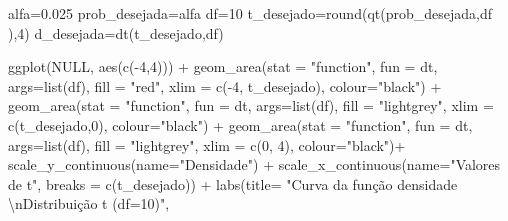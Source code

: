\documentclass[
]{book}
\newenvironment{Shaded}{\begin{snugshade}}{\end{snugshade}}
\newcommand{\AttributeTok}[1]{\textcolor[rgb]{0.77,0.63,0.00}{#1}}
\newcommand{\ConstantTok}[1]{\textcolor[rgb]{0.00,0.00,0.00}{#1}}
\newcommand{\DecValTok}[1]{\textcolor[rgb]{0.00,0.00,0.81}{#1}}
\newcommand{\FloatTok}[1]{\textcolor[rgb]{0.00,0.00,0.81}{#1}}
\newcommand{\FunctionTok}[1]{\textcolor[rgb]{0.00,0.00,0.00}{#1}}
\newcommand{\NormalTok}[1]{#1}
\newcommand{\OtherTok}[1]{\textcolor[rgb]{0.56,0.35,0.01}{#1}}
\newcommand{\SpecialCharTok}[1]{\textcolor[rgb]{0.00,0.00,0.00}{#1}}
\newcommand{\StringTok}[1]{\textcolor[rgb]{0.31,0.60,0.02}{#1}}
\begin{document}
\begin{Shaded}
\begin{Highlighting}[]
\NormalTok{alfa}\OtherTok{=}\FloatTok{0.025}
\NormalTok{prob\_desejada}\OtherTok{=}\NormalTok{alfa}
\NormalTok{df}\OtherTok{=}\DecValTok{10}
\NormalTok{t\_desejado}\OtherTok{=}\FunctionTok{round}\NormalTok{(}\FunctionTok{qt}\NormalTok{(prob\_desejada,df ),}\DecValTok{4}\NormalTok{)}
\NormalTok{d\_desejada}\OtherTok{=}\FunctionTok{dt}\NormalTok{(t\_desejado,df)}


\FunctionTok{ggplot}\NormalTok{(}\ConstantTok{NULL}\NormalTok{, }\FunctionTok{aes}\NormalTok{(}\FunctionTok{c}\NormalTok{(}\SpecialCharTok{{-}}\DecValTok{4}\NormalTok{,}\DecValTok{4}\NormalTok{))) }\SpecialCharTok{+}
  \FunctionTok{geom\_area}\NormalTok{(}\AttributeTok{stat =} \StringTok{"function"}\NormalTok{, }
            \AttributeTok{fun =}\NormalTok{ dt,}
            \AttributeTok{args=}\FunctionTok{list}\NormalTok{(df), }
            \AttributeTok{fill =} \StringTok{"red"}\NormalTok{, }
            \AttributeTok{xlim =} \FunctionTok{c}\NormalTok{(}\SpecialCharTok{{-}}\DecValTok{4}\NormalTok{, t\_desejado),}
            \AttributeTok{colour=}\StringTok{"black"}\NormalTok{) }\SpecialCharTok{+}
  \FunctionTok{geom\_area}\NormalTok{(}\AttributeTok{stat =} \StringTok{"function"}\NormalTok{, }
            \AttributeTok{fun =}\NormalTok{ dt, }
            \AttributeTok{args=}\FunctionTok{list}\NormalTok{(df), }
            \AttributeTok{fill =} \StringTok{"lightgrey"}\NormalTok{, }
            \AttributeTok{xlim =} \FunctionTok{c}\NormalTok{(t\_desejado,}\DecValTok{0}\NormalTok{),}
            \AttributeTok{colour=}\StringTok{"black"}\NormalTok{) }\SpecialCharTok{+}
  \FunctionTok{geom\_area}\NormalTok{(}\AttributeTok{stat =} \StringTok{"function"}\NormalTok{, }
            \AttributeTok{fun =}\NormalTok{ dt, }
            \AttributeTok{args=}\FunctionTok{list}\NormalTok{(df), }
            \AttributeTok{fill =} \StringTok{"lightgrey"}\NormalTok{, }
            \AttributeTok{xlim =} \FunctionTok{c}\NormalTok{(}\DecValTok{0}\NormalTok{, }\DecValTok{4}\NormalTok{),}
            \AttributeTok{colour=}\StringTok{"black"}\NormalTok{)}\SpecialCharTok{+}
  \FunctionTok{scale\_y\_continuous}\NormalTok{(}\AttributeTok{name=}\StringTok{"Densidade"}\NormalTok{) }\SpecialCharTok{+}
  \FunctionTok{scale\_x\_continuous}\NormalTok{(}\AttributeTok{name=}\StringTok{"Valores de t"}\NormalTok{, }\AttributeTok{breaks =} \FunctionTok{c}\NormalTok{(t\_desejado)) }\SpecialCharTok{+}
  \FunctionTok{labs}\NormalTok{(}\AttributeTok{title=} \StringTok{"Curva da função densidade }\SpecialCharTok{\textbackslash{}n}\StringTok{Distribuição t (df=10)"}\NormalTok{, }

\end{Highlighting}
\end{Shaded}
\end{document}

